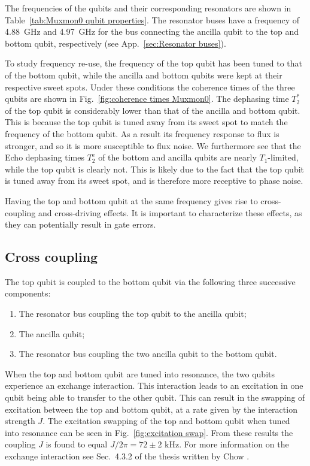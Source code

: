       The frequencies of the qubits and their corresponding resonators are shown in Table~\ref{tab:Muxmon0 qubit properties}. The resonator buses have a frequency of \SI{4.88}{\giga \hertz} and \SI{4.97}{\giga \hertz} for the bus connecting the ancilla qubit to the top and bottom qubit, respectively (see App.~\ref{sec:Resonator buses}).

      To study frequency re-use, the frequency of the top qubit has been tuned to that of the bottom qubit, while the ancilla and bottom qubits were kept at their respective sweet spots. Under these conditions the coherence times of the three qubits are shown in Fig.~\ref{fig:coherence times Muxmon0}. The dephasing time $T_2^*$ of the top qubit is considerably lower than that of the ancilla and bottom qubit. This is because the top qubit is tuned away from its sweet spot to match the frequency of the bottom qubit. As a result its frequency response to flux is stronger, and so it is more susceptible to flux noise. We furthermore see that the Echo dephasing times $T_2^\text{e}$ of the bottom and ancilla qubits are nearly $T_1$-limited, while the top qubit is clearly not. This is likely due to the fact that the top qubit is tuned away from its sweet spot, and is therefore more receptive to phase noise.

      Having the top and bottom qubit at the same frequency gives rise to cross-coupling and cross-driving effects. It is important to characterize these effects, as they can potentially result in gate errors.

    \subsection{Cross coupling}
      \label{ssec:cross coupling}

      The top qubit is coupled to the bottom qubit via the following three successive components:

      \begin{enumerate}
        \item The resonator bus coupling the top qubit to the ancilla qubit;
        \item The ancilla qubit;
        \item The resonator bus coupling the two ancilla qubit to the bottom qubit.
      \end{enumerate}

      When the top and bottom qubit are tuned into resonance, the two qubits experience an exchange interaction. This interaction leads to an excitation in one qubit being able to transfer to the other qubit. This can result in the swapping of excitation between the top and bottom qubit, at a rate given by the interaction strength $J$. The excitation swapping of the top and bottom qubit when tuned into resonance can be seen in Fig.~\ref{fig:excitation swap}. From these results the coupling $J$ is found to equal $J/2\pi=72 \pm 2$ kHz. For more information on the exchange interaction see Sec.~4.3.2 of the thesis written by Chow \cite{Chow}.

